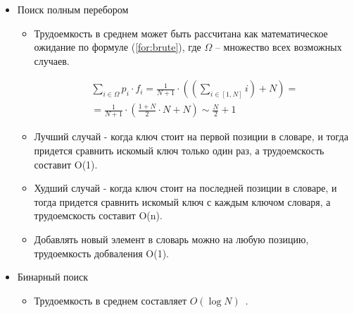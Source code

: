 \begin{itemize}
	\item Поиск полным перебором
	\begin{itemize}
		\item Трудоемкость в среднем может быть рассчитана как математическое ожидание по формуле (\ref{for:brute}), где $\Omega$ -- множество всех возможных случаев.
		
		\begin{equation}
			\label{for:brute}
			\begin{aligned}
				\sum\limits_{i \in \Omega} p_i \cdot f_i = \frac{1}{N + 1} \cdot ((\sum\limits_{i \in [1, N]}i) + N) = \\
				= \frac{1}{N + 1} \cdot (\frac{1 + N}{2} \cdot N + N) \sim \frac{N}{2} + 1
			\end{aligned}
		\end{equation}
			
		
		\item Лучший случай - когда ключ стоит на первой позиции в словаре, и тогда придется сравнить искомый ключ только один раз, а трудоемскость составит O(1).
		
		\item Худший случай - когда ключ стоит на последней позиции в словаре, и тогда придется сравнить искомый ключ с каждым ключом словаря, а трудоемскость составит O(n).
		
		\item Добавлять новый элемент в словарь можно на любую позицию, трудоемкость добваления O(1).

	\end{itemize}


	\item Бинарный поиск
	\begin{itemize}
	\item Трудоемкость в среднем составляет $O(\log{N})$~\cite{second_article}.
	

\end{itemize}
\end{itemize}
